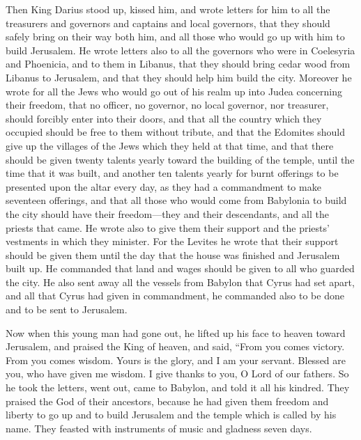  Then King Darius stood up, kissed him, and wrote letters
for him to all the treasurers and governors and captains and local
governors, that they should safely bring on their way both him, and all
those who would go up with him to build Jerusalem.  He
wrote letters also to all the governors who were in Coelesyria and
Phoenicia, and to them in Libanus, that they should bring cedar wood
from Libanus to Jerusalem, and that they should help him build the city.
 Moreover he wrote for all the Jews who would go out of his
realm up into Judea concerning their freedom, that no officer, no
governor, no local governor, nor treasurer, should forcibly enter into
their doors,  and that all the country which they occupied
should be free to them without tribute, and that the Edomites should
give up the villages of the Jews which they held at that time,
 and that there should be given twenty talents yearly
toward the building of the temple, until the time that it was built,
 and another ten talents yearly for burnt offerings to be
presented upon the altar every day, as they had a commandment to make
seventeen offerings,  and that all those who would come
from Babylonia to build the city should have their freedom---they and
their descendants, and all the priests that came.  He wrote
also to give them their support and the priests' vestments in which they
minister.  For the Levites he wrote that their support
should be given them until the day that the house was finished and
Jerusalem built up.  He commanded that land and wages
should be given to all who guarded the city.  He also sent
away all the vessels from Babylon that Cyrus had set apart, and all that
Cyrus had given in commandment, he commanded also to be done and to be
sent to Jerusalem.

 Now when this young man had gone out, he lifted up his
face to heaven toward Jerusalem, and praised the King of heaven,
 and said, ``From you comes victory. From you comes wisdom.
Yours is the glory, and I am your servant.  Blessed are
you, who have given me wisdom. I give thanks to you, O Lord of our
fathers.  So he took the letters, went out, came to
Babylon, and told it all his kindred.  They praised the God
of their ancestors, because he had given them freedom and liberty
 to go up and to build Jerusalem and the temple which is
called by his name. They feasted with instruments of music and gladness
seven days.

